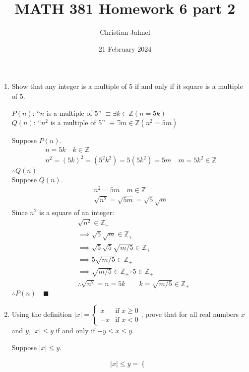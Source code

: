 \documentclass[letterpaper, 12pt]{article}
\title{MATH 381 Homework 6 part 2}
\author{Christian Jahnel}
\date{21 February 2024}
\newcommand{\qed}{\quad \blacksquare}
\begin{document}
\maketitle
\begin{enumerate}
\item Show that any integer is a multiple of 5 if and only if it square is a multiple of 5.
\begin{flushleft}
    $P(n)$: ``$n$ is a multiple of 5'' $\equiv \exists k \in \mathbb{Z} (n = 5k)$ \\
    $Q(n)$: ``$n^2$ is a multiple of 5'' $\equiv \exists m \in \mathbb{Z} (n^2 = 5m)$ 
\end{flushleft}
Suppose $P(n)$.
\begin{gather*}
    n = 5k \quad k \in \mathbb{Z} \\
    n^2 = (5k)^2 = (5^2 k^2) = 5(5k^2) = 5m \quad m = 5k^2 \in \mathbb{Z}
\end{gather*}
$\therefore Q(n)$ \\
Suppose $Q(n)$.
\begin{gather*}
    n^2 = 5m \quad m \in \mathbb{Z} \\
    \sqrt{n^2} = \sqrt{5m} = \sqrt{5}\sqrt{m}
\end{gather*}
Since $n^2$ is a square of an integer:
\begin{align*}
    & \sqrt{n^2} \in \mathbb{Z}_+ \\
    &\implies \sqrt{5}\sqrt{m} \in \mathbb{Z}_+ \\
    &\implies \sqrt{5}\sqrt{5}\sqrt{m/5} \in \mathbb{Z}_+ \\
    &\implies 5\sqrt{m/5} \in \mathbb{Z}_+ \\
    &\implies \sqrt{m/5} \in \mathbb{Z}_+ \because 5 \in \mathbb{Z}_+ \\
    &\therefore \sqrt{n^2} = n = 5k \qquad k = \sqrt{m/5} \in \mathbb{Z}_+
\end{align*}
$\therefore P(n) \qed$
\item Using the definition $|x| = \begin{cases}
    x & \text{if } x \ge 0 \\
    -x & \text{if } x < 0
\end{cases}$, 
prove that for all real numbers $x$ and $y$, $|x| \le y$ if and only if $-y \le x \le y$.
\begin{flushleft}
    Suppose $|x| \le y$.
\end{flushleft}
\begin{gather*}
    |x| \le y = \begin{cases}

\end{cases}
\end{gather*}
\end{enumerate}
\end{document}
